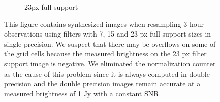 \begin{figure}[ht!]
\begin{mdframed}
\begin{subfigure}[b]{0.3\textwidth}
      \caption{23px full support}
    \end{subfigure}
    \caption[Precision error in simulated 3 hour MeerKAT observations]{This figure contains synthesized images when resampling 3 hour observations using filters with 7, 15 and 23 px full support sizes in single precision. We suspect 
    that there may be overflows on some of the grid cells because the measured brightness on the 23 px filter support image is negative. We eliminated the normalization counter as the cause of this problem since it is always computed in double precision
    and the double precision images remain accurate at a measured brightness of 1 Jy with a constant SNR.}
    \label{FIG_PREC_ERROR_IMAGES}
 \end{mdframed}
\end{figure}
